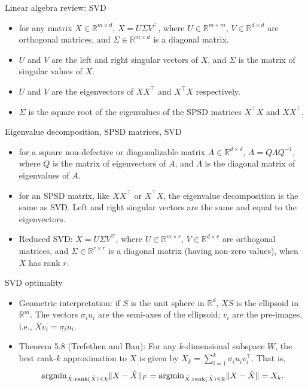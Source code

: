 \documentclass[final]{beamer}
\begin{document}
\begin{frame}{Linear algebra review: SVD}
	\begin{itemize}
		\item for any matrix $X \in \mathbb{R}^{m\times d}$, $X = U \Sigma V^\top$, where $U \in \mathbb{R}^{m\times m}$, $V \in \mathbb{R}^{d\times d}$ are orthogonal matrices, and $\Sigma \in \mathbb{R}^{m\times d}$ is a diagonal matrix.
		\pause
		\item $U$ and $V$ are the left and right singular vectors of $X$, and $\Sigma$ is the matrix of singular values of $X$.
		\pause
		\item $U$ and $V$ are the eigenvectors of $XX^\top$ and $X^\top X$ respectively.
		\pause
		\item $\Sigma$ is the square root of the eigenvalues of the SPSD matrices $X^\top X$ and $XX^\top$.
		

	\end{itemize}
\end{frame}
\begin{frame}{Eigenvalue decomposition, SPSD matrices, SVD}
\begin{itemize}
	\item for a square non-defective or diagonalizable matrix $A \in \mathbb{R}^{d\times d}$, $A = Q \Lambda Q^{-1}$, where $Q$ is the matrix of eigenvectors of $A$, and $\Lambda$ is the diagonal matrix of eigenvalues of $A$.
	\pause
	\item for an SPSD matrix, like $X X^\top$ or $X^\top X$, the eigenvalue decomposition is the same as SVD. Left and right singular vectors are the same and equal to the eigenvectors.
	\pause 
\item Reduced SVD: $X = U \Sigma V^\top$, where $U \in \mathbb{R}^{m\times r}$, $V \in \mathbb{R}^{d\times r}$ are orthogonal matrices, and $\Sigma \in \mathbb{R}^{r\times r}$ is a diagonal matrix (having non-zero values), when $X$ has rank $r$.
\end{itemize}
\end{frame}
\begin{frame}{SVD optimality}
	\begin{itemize}
		\item Geometric interpretation: if $S$ is the unit sphere in $\mathbb{R}^d$, $XS$ is the ellipsoid in $\mathbb{R}^m$. The vectors $\sigma_i u_i$ are the semi-axes of the ellipsoid; $v_i$ are the pre-images, i.e., $Xv_i = \sigma_i u_i$.
	\pause
	\item Theorem 5.8 (Trefethen and Bau): For any $k$-dimensional subspace $W$, the best rank-$k$ approximation to $X$ is given by $X_k = \sum_{i=1}^k \sigma_i u_i v_i^\top$. That is, 
	$$ {\rm arg min}_{\hat{X}: {\rm rank}(\hat{X})\leq k } \|X - \hat{X}\|_F =  {\rm arg min}_{\hat{X}: {\rm rank}(\hat{X})\leq k } \|X - \hat{X}\| =  X_k.$$
	\end{itemize}
\end{frame}
\end{document}
